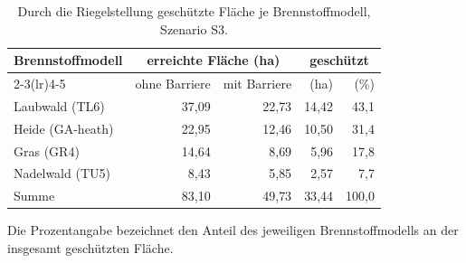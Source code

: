 \begin{table}[htbp]
  \centering
  \caption{Durch die Riegelstellung geschützte Fläche je Brennstoffmodell, Szenario S3.}
  \label{tab:mtt-fuel}
  \begin{tabular}{lrrrr}
    \toprule
    Brennstoffmodell & \multicolumn{2}{c}{erreichte Fläche (ha)} & \multicolumn{2}{c}{geschützt} \\
    \cmidrule(lr){2-3}\cmidrule(lr){4-5}
     & ohne Barriere & mit Barriere & (ha) & (\%) \\
    \midrule
    Laubwald (TL6)   & 37{,}09 & 22{,}73 & 14{,}42 & 43{,}1 \\
    Heide (GA-heath) & 22{,}95 & 12{,}46 & 10{,}50 & 31{,}4 \\
    Gras (GR4)       & 14{,}64 &  8{,}69 &  5{,}96 & 17{,}8 \\
    Nadelwald (TU5)  &  8{,}43 &  5{,}85 &  2{,}57 &  7{,}7 \\
    \midrule
    Summe            & 83{,}10 & 49{,}73 & 33{,}44 & 100{,}0 \\
    \bottomrule
  \end{tabular}
  \par\smallskip\footnotesize Die Prozentangabe bezeichnet den Anteil des jeweiligen Brennstoffmodells an der insgesamt geschützten Fläche.
\end{table}
